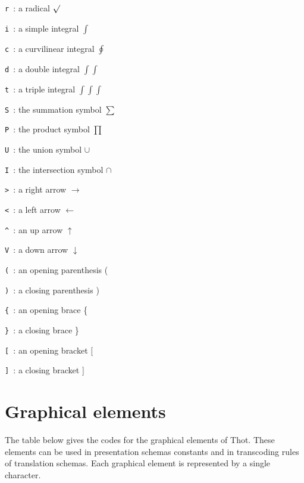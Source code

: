 \begin{description}
\item{ {\tt r }}: a radical $\surd$
\item{ {\tt i }}: a simple integral $\int$
\item{ {\tt c }}: a curvilinear integral $\oint$
\item{ {\tt d }}: a double integral $\int\int$
\item{ {\tt t }}: a triple integral $\int\int\int$
\item{ {\tt S }}: the summation symbol $\sum$
\item{ {\tt P }}: the product symbol $\prod$
\item{ {\tt U }}: the union symbol $\cup$
\item{ {\tt I }}: the intersection symbol $\cap$
\item{ {\tt > }}: a right arrow $\rightarrow$
\item{ {\tt < }}: a left arrow $\leftarrow$
\item{ {\tt \^{ } }}:  an up arrow $\uparrow$
\item{ {\tt V }}: a down arrow $\downarrow$
\item{ {\tt ( }}: an opening parenthesis (
\item{ {\tt ) }}: a closing parenthesis )
\item{ {\tt \{ }}: an opening brace \{
\item{ {\tt \} }}: a closing brace \}
\item{ {\tt [ }}: an opening bracket [
\item{ {\tt ] }}: a closing bracket ]
\end{description}

\section{Graphical elements}

The table below gives the codes for the graphical elements of Thot.
These elements can be used in presentation schemas constants and in
transcoding rules of translation schemas.  Each graphical element is
represented by a single character.

